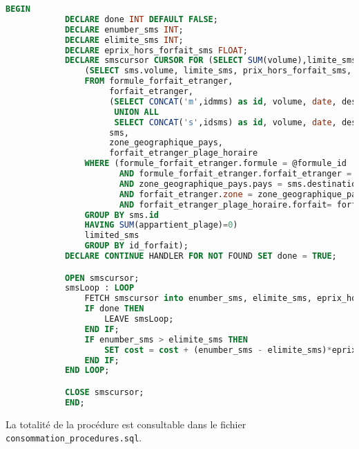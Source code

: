 \begin{lstlisting}[language=sql]
 BEGIN
            DECLARE done INT DEFAULT FALSE;
            DECLARE enumber_sms INT;
            DECLARE elimite_sms INT;
            DECLARE eprix_hors_forfait_sms FLOAT;
            DECLARE smscursor CURSOR FOR (SELECT SUM(volume),limite_sms, prix_hors_forfait_sms FROM
                (SELECT sms.volume, limite_sms, prix_hors_forfait_sms, isInPlageHoraire(sms.date, forfait_etranger_plage_horaire.plage) AS appartient_plage, forfait_etranger.id as id_forfait
                FROM formule_forfait_etranger,
                     forfait_etranger,
                     (SELECT CONCAT('m',idmms) as id, volume, date, destination FROM mms WHERE consommation=consoId
                      UNION ALL
                      SELECT CONCAT('s',idsms) as id, volume, date, destination FROM sms WHERE consommation=consoId)
                     sms,
                     zone_geographique_pays,
                     forfait_etranger_plage_horaire
                WHERE (formule_forfait_etranger.formule = @formule_id
                       AND formule_forfait_etranger.forfait_etranger = forfait_etranger.id
                       AND zone_geographique_pays.pays = sms.destination
                       AND forfait_etranger.zone = zone_geographique_pays.zone_geographique
                       AND forfait_etranger_plage_horaire.forfait= forfait_etranger.id)
                GROUP BY sms.id
                HAVING SUM(appartient_plage)=0)
                limited_sms
                GROUP BY id_forfait);
            DECLARE CONTINUE HANDLER FOR NOT FOUND SET done = TRUE;

            OPEN smscursor;
            smsLoop : LOOP
                FETCH smscursor into enumber_sms, elimite_sms, eprix_hors_forfait_sms;
                IF done THEN
                    LEAVE smsLoop;
                END IF;
                IF enumber_sms > elimite_sms THEN
                    SET cost = cost + (enumber_sms - elimite_sms)*eprix_hors_forfait_sms;
                END IF;
            END LOOP;

            CLOSE smscursor;
            END;
\end{lstlisting}

La totalité de la procédure est consultable dans le fichier \texttt{consommation\_procedures.sql}.
